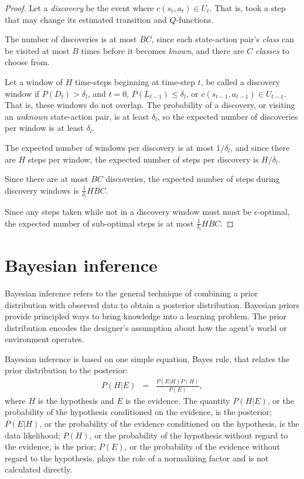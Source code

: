 \begin{proof}
Let a \emph{discovery} be the event where $c(s_t,a_t) \in U_t$. That is, \A took a step that may change its estimated transition and $Q$-functions.

The number of discoveries is at most $B C$, since each state-action pair's \emph{class} can be visited at most $B$ times before it becomes \emph{known}, and there are $C$ \emph{classes} to choose from.

Let a window of $H$ time-steps beginning at time-step $t$, be called a discovery window if $P(D_t) > \delta_l$, and $t=0$, $P(L_{t-1}) \leq \delta_l$, or $c(s_{t-1},a_{t-1}) \in U_{t-1}$. That is, these windows do not overlap. The probability of a discovery, or visiting an \emph{unknown} state-action pair, is at least $\delta_l$, so the expected number of discoveries per window is at least $\delta_l$.

The expected number of windows per discovery is at most $1/\delta_l$, and since there are $H$ steps per window, the expected number of steps per discovery is $H / \delta_l$.

Since there are at most $B C$ discoveries, the expected number of steps during discovery windows is $\frac 1 {\delta_l} H B C$.

Since any steps taken while not in a discovery window must must be $\epsilon$-optimal, the expected number of sub-optimal steps is at most $\frac 1 {\delta_l} H B C$.

\end{proof}

\section{Bayesian inference}

Bayesian inference refers to the general technique of combining a prior distribution with observed data to obtain a posterior distribution. Bayesian priors provide principled ways to bring knowledge into a learning problem. The prior distribution encodes the designer's assumption about how the agent's world or environment operates.

Bayesian inference is based on one simple equation, Bayes rule, that relates the prior distribution to the posterior:
\begin{eqnarray}
\label{intro:eqn:bayes} P(H|E) &=& \frac{P(E|H)P(H)}{P(E)},
\end{eqnarray}
where $H$ is the hypothesis and $E$ is the evidence. The quantity $P(H|E)$, or the probability of the hypothesis conditioned on the evidence, is the posterior; $P(E|H)$, or the probability of the evidence conditioned on the hypothesis, is the data likelihood; $P(H)$, or the probability of the hypothesis without regard to the evidence, is the prior; $P(E)$, or the probability of the evidence without regard to the hypothesis, plays the role of a normalizing factor and is not calculated directly.

